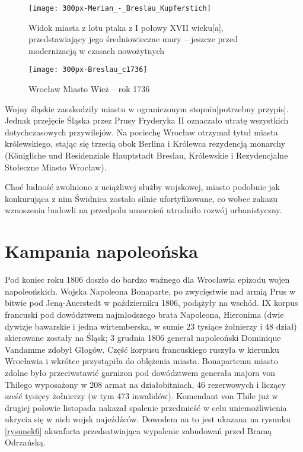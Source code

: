 \documentclass{article}
\begin{document}
\begin{figure}[h]
\centering

\texttt{[image: 300px-Merian\_-\_Breslau\_Kupferstich]}
\caption{Widok miasta z lotu ptaka z I połowy XVII wieku[a], przedstawiający jego średniowieczne mury – jeszcze przed modernizacją w czasach nowożytnych}
\label{rysunek4}
\end{figure}

\begin{figure}[h]
\centering

\texttt{[image: 300px-Breslau\_c1736]}
\caption{Wrocław Miasto Wież – rok 1736}
\label{rysunek5}
\end{figure}

\noindent Wojny śląskie zaszkodziły miastu w ograniczonym stopniu[potrzebny przypis]. Jednak przejęcie Śląska przez Prusy Fryderyka II oznaczało utratę wszystkich dotychczasowych przywilejów. Na pociechę Wrocław otrzymał tytuł miasta królewskiego, stając się trzecią obok Berlina i Królewca rezydencją monarchy (Königliche und Residenziale Hauptstadt Breslau, Królewskie i Rezydencjalne Stołeczne Miasto Wrocław).

\vspace{6pt}

\noindent Choć ludność zwolniono z uciążliwej służby wojskowej, miasto podobnie jak konkurująca z nim Świdnica zostało silnie ufortyfikowane, co wobec zakazu wznoszenia budowli na przedpolu umocnień utrudniło rozwój urbanistyczny.

\section*{Kampania napoleońska}
Pod koniec roku 1806 doszło do bardzo ważnego dla Wrocławia epizodu wojen napoleońskich. Wojska Napoleona Bonaparte, po zwycięstwie nad armią Prus w bitwie pod Jeną-Auerstedt w październiku 1806, podążyły na wschód. IX korpus francuski pod dowództwem najmłodszego brata Napoleona, Hieronima (dwie dywizje bawarskie i jedna wirtemberska, w sumie 23 tysiące żołnierzy i 48 dział) skierowane zostały na Śląsk; 3 grudnia 1806 generał napoleoński Dominique Vandamme zdobył Głogów. Część korpusu francuskiego ruszyła w kierunku Wrocławia i wkrótce przystąpiła do oblężenia miasta. Bonapartemu miasto zdolne było przeciwstawić garnizon pod dowództwem generała majora von Thilego wyposażony w 208 armat na działobitniach, 46 rezerwowych i liczący sześć tysięcy żołnierzy (w tym 473 inwalidów). Komendant von Thile już w drugiej połowie listopada nakazał spalenie przedmieść w celu uniemożliwienia ukrycia się w nich wojsk najeźdźców. Dowodem na to jest ukazana na rysunku \ref{rysunek6} akwaforta przedsatwiająca wypalenie zabudowań przed Bramą Odrzańską.
\end{document}
